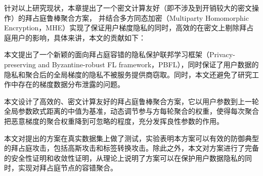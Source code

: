 针对以上研究现状，本章提出了一个密文计算友好（即不涉及到开销较大的密文操作）的拜占庭鲁棒聚合方案，
并结合多方同态加密（Multiparty Homomorphic Encryption，MHE）实现了保证用户梯度隐私的同时，高效的在密文上剔除拜占庭用户的影响，具体来讲，本文的贡献如下：
\begin{compactenum}
	\item  本文提出了一个新颖的面向拜占庭容错的隐私保护联邦学习框架（Privacy-preserving and Byzantine-robust FL framework，PBFL），同时保证了用户数据的隐私和聚合后的全局梯度的隐私不被服务提供商窃取。同时，本文还避免了研究工作\cite{liu2021privacy}中存在的梯度数据分布泄露的问题。
	\item 本文设计了高效的、密文计算友好的拜占庭鲁棒聚合方案，它以用户参数到上一轮全局参数欧式距离的中值为基准，动态调节参与方每轮聚合的权重，使得每次聚合把恶意梯度的聚合权重降到可忽略的程度，充分发挥良性参数的作用。
	\item 本文对提出的方案在真实数据集上做了测试，实验表明本方案可以有效的防御典型的拜占庭攻击，包括高斯攻击和标签转换攻击。除此之外，本文对方案进行了完备的安全性证明和收敛性证明，从理论上说明了方案可以在保护用户数据隐私的同时，实现对拜占庭节点的容错聚合。
\end{compactenum}

\begin{table}[!h]
	\centering
	\caption{与类似方案在相关属性上的粗粒度对比}
	\label{cmp}
\end{table}

